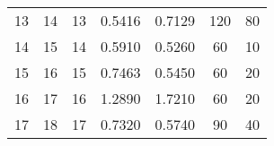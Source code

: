 \begin{table}[]
\begin{adjustbox}{width=1.1\textwidth,center=\textwidth}
\begin{tabular}{@{}ccccccc@{}}
13                                                             & 14                                                             & 13                                                   & 0.5416                                                                         & 0.7129                                                                         & 120                                                                              & 80                                                                                   \\
14                                                             & 15                                                             & 14                                                   & 0.5910                                                                         & 0.5260                                                                         & 60                                                                               & 10                                                                                   \\
15                                                             & 16                                                             & 15                                                   & 0.7463                                                                         & 0.5450                                                                         & 60                                                                               & 20                                                                                   \\
16                                                             & 17                                                             & 16                                                   & 1.2890                                                                         & 1.7210                                                                         & 60                                                                               & 20                                                                                   \\
17                                                             & 18                                                             & 17                                                   & 0.7320                                                                         & 0.5740                                                                         & 90                                                                               & 40                                                                                   \\

\end{tabular}
\end{adjustbox}
\end{table}
